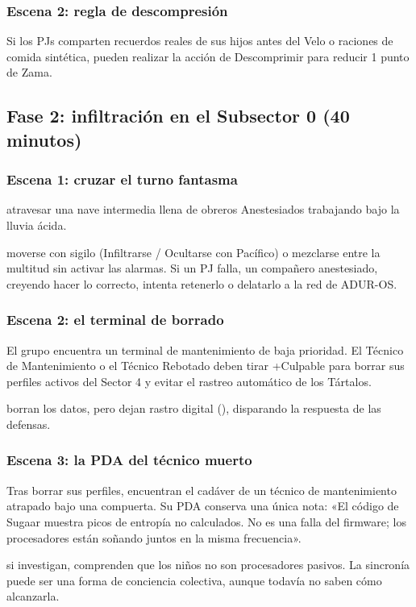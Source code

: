 \subsubsection{Escena 2: regla de descompresión}
Si los PJs comparten recuerdos reales de sus hijos antes del Velo o raciones de comida sintética, pueden realizar la acción de Descomprimir para reducir 1 punto de Zama.

\subsection{Fase 2: infiltración en el Subsector 0 (40 minutos)}

\subsubsection{Escena 1: cruzar el turno fantasma}
 atravesar una nave intermedia llena de obreros Anestesiados trabajando bajo la lluvia ácida.\par
{} moverse con sigilo (Infiltrarse / Ocultarse con Pacífico) o mezclarse entre la multitud sin activar las alarmas. Si un PJ falla, un compañero anestesiado, creyendo hacer lo correcto, intenta retenerlo o delatarlo a la red de ADUR-OS.

\subsubsection{Escena 2: el terminal de borrado}
El grupo encuentra un terminal de mantenimiento de baja prioridad. El Técnico de Mantenimiento o el Técnico Rebotado deben tirar +Culpable para borrar sus perfiles activos del Sector 4 y evitar el rastreo automático de los Tártalos.\par
{} borran los datos, pero dejan rastro digital (), disparando la respuesta de las defensas.

\subsubsection{Escena 3: la PDA del técnico muerto}
Tras borrar sus perfiles, encuentran el cadáver de un técnico de mantenimiento atrapado bajo una compuerta. Su PDA conserva una única nota: «El código de Sugaar muestra picos de entropía no calculados. No es una falla del firmware; los procesadores están soñando juntos en la misma frecuencia».\par
{} si investigan, comprenden que los niños no son procesadores pasivos. La sincronía puede ser una forma de conciencia colectiva, aunque todavía no saben cómo alcanzarla.

